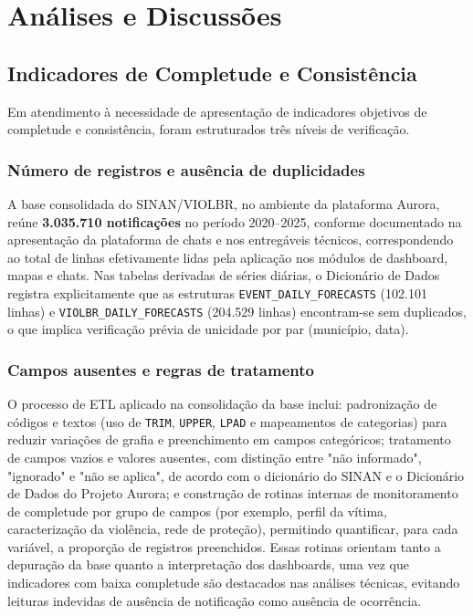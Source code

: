 \documentclass[11pt,a4paper]{article}
\begin{document}
\clearpage
\section{Análises e Discussões}
\label{sec:analises}

\subsection{Indicadores de Completude e Consistência}
\label{subsec:completude}

Em atendimento à necessidade de apresentação de indicadores objetivos de completude e consistência, foram estruturados três níveis de verificação.

\subsubsection{Número de registros e ausência de duplicidades}

A base consolidada do SINAN/VIOLBR, no ambiente da plataforma Aurora, reúne \textbf{3.035.710 notificações} no período 2020–2025, conforme documentado na apresentação da plataforma de chats e nos entregáveis técnicos, correspondendo ao total de linhas efetivamente lidas pela aplicação nos módulos de dashboard, mapas e chats. Nas tabelas derivadas de séries diárias, o Dicionário de Dados registra explicitamente que as estruturas \texttt{EVENT\_DAILY\_FORECASTS} (102.101 linhas) e \texttt{VIOLBR\_DAILY\_FORECASTS} (204.529 linhas) encontram-se sem duplicados, o que implica verificação prévia de unicidade por par (município, data).

\subsubsection{Campos ausentes e regras de tratamento}

O processo de ETL aplicado na consolidação da base inclui: padronização de códigos e textos (uso de \texttt{TRIM}, \texttt{UPPER}, \texttt{LPAD} e mapeamentos de categorias) para reduzir variações de grafia e preenchimento em campos categóricos; tratamento de campos vazios e valores ausentes, com distinção entre "não informado", "ignorado" e "não se aplica", de acordo com o dicionário do SINAN e o Dicionário de Dados do Projeto Aurora; e construção de rotinas internas de monitoramento de completude por grupo de campos (por exemplo, perfil da vítima, caracterização da violência, rede de proteção), permitindo quantificar, para cada variável, a proporção de registros preenchidos. Essas rotinas orientam tanto a depuração da base quanto a interpretação dos dashboards, uma vez que indicadores com baixa completude são destacados nas análises técnicas, evitando leituras indevidas de ausência de notificação como ausência de ocorrência.
\end{document}
